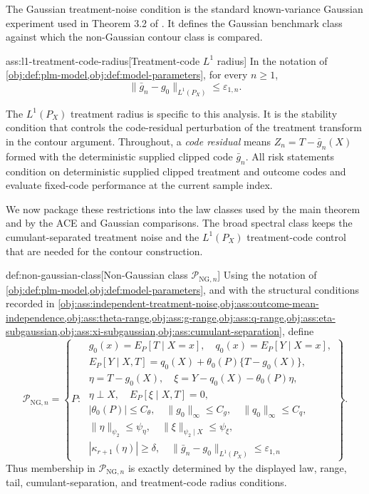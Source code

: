 \documentclass[11pt]{article}
\begin{document}
The Gaussian treatment-noise condition is the standard known-variance Gaussian experiment used in Theorem 3.2 of \citet{JinMackeySyrgkanis2025}. It defines the Gaussian benchmark class against which the non-Gaussian contour class is compared.

\begin{assumptionv}{ass:l1-treatment-code-radius}[Treatment-code \(L^1\) radius]
In the notation of \cref{obj:def:plm-model,obj:def:model-parameters}, for every \(n\ge 1\),
\[
\|\bar g_n-g_0\|_{L^1(P_X)}\le \varepsilon_{1,n}.
\]
\end{assumptionv}

The \(L^1(P_X)\) treatment radius is specific to this analysis. It is the stability condition that controls the code-residual perturbation of the treatment transform in the contour argument. Throughout, a \emph{code residual} means \(Z_n=T-\bar g_n(X)\) formed with the deterministic supplied clipped code \(\bar g_n\). All risk statements condition on deterministic supplied clipped treatment and outcome codes and evaluate fixed-code performance at the current sample index.

We now package these restrictions into the law classes used by the main theorem and by the ACE and Gaussian comparisons. The broad spectral class keeps the cumulant-separated treatment noise and the \(L^1(P_X)\) treatment-code control that are needed for the contour construction.

\begin{definitionv}{def:non-gaussian-class}[Non-Gaussian class \(\mathcal P_{\mathrm{NG},n}\)]
Using the notation of \cref{obj:def:plm-model,obj:def:model-parameters}, and with the structural conditions recorded in \cref{obj:ass:independent-treatment-noise,obj:ass:outcome-mean-independence,obj:ass:theta-range,obj:ass:g-range,obj:ass:q-range,obj:ass:eta-subgaussian,obj:ass:xi-subgaussian,obj:ass:cumulant-separation}, define
\[
\mathcal P_{\mathrm{NG},n}
=
\left\{
P:\;
\begin{array}{l}
g_0(x)=E_P[T\mid X=x],\quad q_0(x)=E_P[Y\mid X=x],\\
E_P[Y\mid X,T]=q_0(X)+\theta_0(P)\{T-g_0(X)\},\\
\eta=T-g_0(X),\quad
\xi=Y-q_0(X)-\theta_0(P)\eta,\\
\eta\perp X,\quad E_P[\xi\mid X,T]=0,\\
|\theta_0(P)|\le C_{\theta},\quad
\|g_0\|_{\infty}\le C_g,\quad
\|q_0\|_{\infty}\le C_q,\\
\|\eta\|_{\psi_2}\le\psi_{\eta},\quad
\|\xi\|_{\psi_2\mid X}\le\psi_{\xi},\\
|\kappa_{r+1}(\eta)|\ge\delta,\quad
\|\bar g_n-g_0\|_{L^1(P_X)}\le\varepsilon_{1,n}
\end{array}
\right\}.
\]
Thus membership in \(\mathcal P_{\mathrm{NG},n}\) is exactly determined by the displayed law, range, tail, cumulant-separation, and treatment-code radius conditions.
\end{definitionv}
\end{document}
